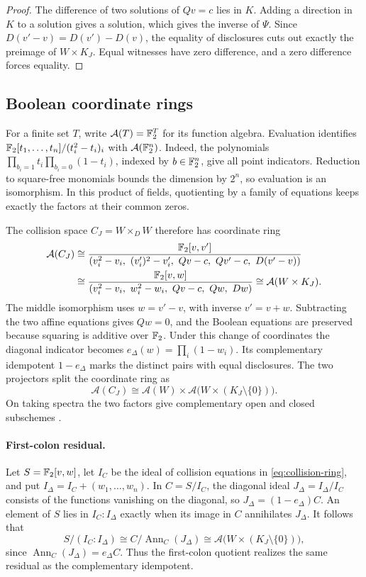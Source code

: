 \begin{proof}
The difference of two solutions of \(Qv=c\) lies in \(K\). Adding a
direction in \(K\) to a solution gives a solution, which gives the inverse
of \(\Psi\). Since \(D(v'-v)=D(v')-D(v)\), the equality of disclosures
cuts out exactly the preimage of \(W\times K_J\). Equal witnesses have
zero difference, and a zero difference forces equality.
\end{proof}

\subsection{Boolean coordinate rings}
\label{sec:boolean-disclosure}

For a finite set \(T\), write \(\mathcal A(T)=\mathbb F_2^T\) for its function
algebra. Evaluation identifies
\(\mathbb F_2[t_1,\ldots,t_n]/(t_i^2-t_i)_i\) with
\(\mathcal A(\mathbb F_2^n)\). Indeed, the polynomials
\(\prod_{b_i=1}t_i\prod_{b_i=0}(1-t_i)\), indexed by \(b\in\mathbb F_2^n\),
give all point indicators. Reduction to square-free monomials bounds
the dimension by \(2^n\), so evaluation is an isomorphism. In this
product of fields, quotienting by a family of equations keeps exactly
the factors at their common zeros.

The collision space \(C_J=W\times_D W\) therefore has coordinate ring
\begin{align}
\mathcal A(C_J)
 &\cong
 \frac{\mathbb F_2[v,v']}{(v_i^2-v_i,\ (v_i')^2-v_i',\ Qv-c,\ Qv'-c,\
                     D(v'-v))} \notag\\
 &\cong
 \frac{\mathbb F_2[v,w]}{(v_i^2-v_i,\ w_i^2-w_i,\ Qv-c,\ Qw,\ Dw)}
 \cong \mathcal A(W\times K_J).
 \label{eq:collision-ring}
\end{align}
The middle isomorphism uses \(w=v'-v\), with inverse \(v'=v+w\).
Subtracting the two affine equations gives \(Qw=0\), and the Boolean
equations are preserved because squaring is additive over \(\mathbb F_2\).
Under this change of coordinates the diagonal indicator becomes
\(e_\Delta(w)=\prod_i(1-w_i)\). Its complementary idempotent
\(1-e_\Delta\) marks the distinct pairs with equal disclosures.
The two projectors split the coordinate ring as
\[
  \mathcal A(C_J)\cong
  \mathcal A(W)\times\mathcal A\bigl(W\times(K_J\setminus\{0\})\bigr).
\]
On taking spectra the two factors give complementary open and closed
subschemes \cite[Tag 04PN]{stacksclopen}.

\paragraph{First-colon residual.}
Let \(S=\mathbb F_2[v,w]\), let \(I_C\) be the ideal of collision equations
in \eqref{eq:collision-ring}, and put \(I_\Delta=I_C+(w_1,\ldots,w_n)\).
In \(C=S/I_C\), the diagonal ideal \(J_\Delta=I_\Delta/I_C\) consists of
the functions vanishing on the diagonal, so \(J_\Delta=(1-e_\Delta)C\).
An element of \(S\) lies in \(I_C:I_\Delta\) exactly when its image in
\(C\) annihilates \(J_\Delta\). It follows that
\[
 S/(I_C:I_\Delta)\cong C/\operatorname{Ann}_C(J_\Delta)
 \cong \mathcal A\bigl(W\times(K_J\setminus\{0\})\bigr),
\]
since \(\operatorname{Ann}_C(J_\Delta)=e_\Delta C\). Thus the first-colon
quotient realizes the same residual as the complementary idempotent.


